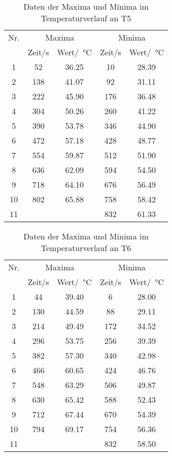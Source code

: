 \begin{table}
  \centering
  \begin{tabular}{c|c|c|c|c}
    \toprule
    Nr. &\multicolumn{2}{c}{Maxima} & \multicolumn{2}{c}{Minima}\\
         &Zeit/s & Wert/\SI{}{\degreeCelsius} & Zeit/s & Wert/\SI{}{\degreeCelsius}\\
    \midrule
    1 & 52 & 36.25&10   &28.39\\
    2 & 138& 41.07&92  &31.11\\
    3 & 222 & 45.90&176&36.48\\
    4 & 304 & 50.26&260&41.22\\
    5 & 390 & 53.78&346&44.90\\
    6 & 472 & 57.18&428&48.77\\
    7 & 554 & 59.87&512&51.90\\
    8 & 636 & 62.09&594&54.50\\
    9 & 718 & 64.10&676&56.49\\
    10& 802& 65.88&758&58.42\\
   11 &        &       &832&61.33\\
    \bottomrule
  \end{tabular}
  \caption{Daten der Maxima und Minima im Temperaturverlauf an T5}
  \label{tab:daten_t5}
\end{table}

\begin{table}
  \centering
  \begin{tabular}{c|c|c|c|c}
    \toprule
    Nr. &\multicolumn{2}{c}{Maxima} & \multicolumn{2}{c}{Minima}\\
         &Zeit/s & Wert/\SI{}{\degreeCelsius} & Zeit/s & Wert/\SI{}{\degreeCelsius}\\
    \midrule
    1 & 44 & 39.40&6   &28.00\\
    2 & 130& 44.59&88  &29.11\\
    3 & 214 & 49.49&172&34.52\\
    4 & 296 & 53.75&256&39.39\\
    5 & 382 & 57.30&340&42.98\\
    6 & 466 & 60.65&424&46.76\\
    7 & 548 & 63.29&506&49.87\\
    8 & 630 & 65.42&588&52.43\\
    9 & 712 & 67.44&670&54.39\\
    10& 794& 69.17&754&56.36\\
   11 &        &       &832&58.50\\
    \bottomrule
  \end{tabular}
  \caption{Daten der Maxima und Minima im Temperaturverlauf an T6}
  \label{tab:daten_t6}
\end{table}

